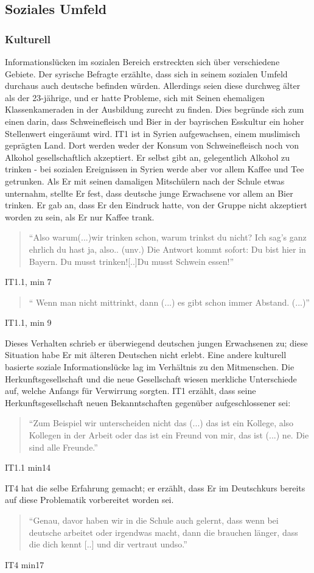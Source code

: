 \subsection{Soziales Umfeld}

\subsubsection{Kulturell}
Informationslücken im sozialen Bereich erstreckten sich über verschiedene Gebiete. Der syrische Befragte erzählte, dass sich in seinem sozialen Umfeld durchaus auch deutsche befinden würden. Allerdings seien diese durchweg älter als der 23-jährige, und er hatte Probleme, sich mit Seinen ehemaligen Klassenkameraden in der Ausbildung zurecht zu finden. Dies begründe sich zum einen darin, dass Schweinefleisch und Bier in der bayrischen Esskultur ein hoher Stellenwert eingeräumt wird. IT1 ist in Syrien aufgewachsen, einem muslimisch geprägten Land. Dort werden weder der Konsum von Schweinefleisch noch von Alkohol gesellschaftlich akzeptiert.\newline
Er selbst gibt an, gelegentlich Alkohol zu trinken - bei sozialen Ereignissen in Syrien werde aber vor allem Kaffee und Tee getrunken. Als Er mit seinen damaligen Mitschülern nach der Schule etwas unternahm, stellte Er fest, dass deutsche junge Erwachsene vor allem an Bier trinken. Er gab an, dass Er den Eindruck hatte, von der Gruppe nicht akzeptiert worden zu sein, als Er nur Kaffee trank.
\begin{quote}
    ``Also warum(...)wir trinken schon, warum trinkst du nicht? Ich sag's ganz ehrlich du hast ja, also.. (unv.) Die Antwort kommt sofort: Du bist hier in Bayern. Du musst trinken![..]Du musst Schwein essen!''
\end{quote}
\caption{IT1.1, min 7}
\begin{quote}
    `` Wenn man nicht mittrinkt, dann (...) es gibt schon immer Abstand. (...)''
\end{quote}
\caption{IT1.1, min 9}
Dieses Verhalten schrieb er überwiegend deutschen jungen Erwachsenen zu; diese Situation habe Er mit älteren Deutschen nicht erlebt.\newline
Eine andere kulturell basierte soziale Informationslücke lag im Verhältnis zu den Mitmenschen. Die Herkunftsgesellschaft und die neue Gesellschaft wiesen merkliche Unterschiede auf, welche Anfangs für Verwirrung sorgten.\newline
IT1 erzählt, dass seine Herkunftsgesellschaft neuen Bekanntschaften gegenüber aufgeschlossener sei:
\begin{quote}
    ``Zum Beispiel wir unterscheiden nicht das (...) das ist ein Kollege, also Kollegen in der Arbeit oder das ist ein Freund von mir, das ist (...) ne. Die sind alle Freunde.''
\end{quote}
\caption{IT1.1 min14}
IT4 hat die selbe Erfahrung gemacht; er erzählt, dass Er im Deutschkurs bereits auf diese Problematik vorbereitet worden sei.
\begin{quote}
    ``Genau, davor haben wir in die Schule auch gelernt, dass wenn bei deutsche arbeitet oder irgendwas macht, dann die brauchen länger, dass die dich kennt [..] und dir vertraut undso.''
\end{quote}
\caption{IT4 min17}

